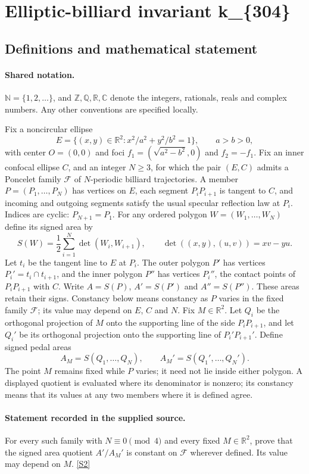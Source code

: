 \documentclass[11pt]{article}
\newcommand{\sref}[2]{\hyperlink{source:#1:#2}{[S#2]}}
\begin{document}
\section{Elliptic-billiard invariant k\_\{304\}}\label{statement}

\subsection{Definitions and mathematical statement}

\paragraph{Shared notation.}$\mathbb N=\{1,2,\ldots\}$, and $\mathbb Z,\mathbb Q,\mathbb R,\mathbb C$ denote the integers, rationals, reals and complex numbers. Any other conventions are specified locally.


Fix a noncircular ellipse
\[
E=\{(x,y)\in\mathbb R^2:x^2/a^2+y^2/b^2=1\},\qquad a>b>0,
\]
with center $O=(0,0)$ and foci $f_1=(\sqrt{a^2-b^2},0)$ and $f_2=-f_1$. Fix an inner confocal ellipse $C$, and an integer $N\geq3$, for which the pair $(E,C)$ admits a Poncelet family $\mathcal F$ of $N$-periodic billiard trajectories. A member $P=(P_1,\ldots,P_N)$ has vertices on $E$, each segment $P_iP_{i+1}$ is tangent to $C$, and incoming and outgoing segments satisfy the usual specular reflection law at $P_i$. Indices are cyclic: $P_{N+1}=P_1$.
For any ordered polygon $W=(W_1,\ldots,W_N)$ define its signed area by
\[
S(W)=\frac12\sum_{i=1}^N\det(W_i,W_{i+1}),\qquad
\det((x,y),(u,v))=xv-yu.
\]
Let $t_i$ be the tangent line to $E$ at $P_i$. The outer polygon $P'$ has vertices $P_i'=t_i\cap t_{i+1}$, and the inner polygon $P''$ has vertices $P_i''$, the contact points of $P_iP_{i+1}$ with $C$. Write $A=S(P)$, $A'=S(P')$ and $A''=S(P'')$. These areas retain their signs. Constancy below means constancy as $P$ varies in the fixed family $\mathcal F$; its value may depend on $E$, $C$ and $N$.
Fix $M\in\mathbb R^2$. Let $Q_i$ be the orthogonal projection of $M$ onto the supporting line of the side $P_iP_{i+1}$, and let $Q_i'$ be its orthogonal projection onto the supporting line of $P_i'P_{i+1}'$. Define signed pedal areas
\[
A_M=S(Q_1,\ldots,Q_N),\qquad A_M'=S(Q_1',\ldots,Q_N').
\]
The point $M$ remains fixed while $P$ varies; it need not lie inside either polygon.
A displayed quotient is evaluated where its denominator is nonzero; its constancy means that its values at any two members where it is defined agree.
\paragraph{Statement recorded in the supplied source.}
For every such family with $N\equiv0\pmod4$ and every fixed $M\in\mathbb R^2$, prove that the signed area quotient $A'/A_M'$ is constant on $\mathcal F$ wherever defined. Its value may depend on $M$. \sref{statement}{2}
\end{document}
